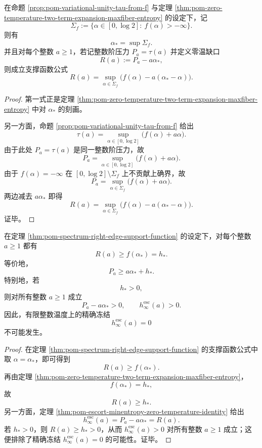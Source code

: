 \begin{theorem}[层集谱右端点与零温缺口的支撑函数表达]\label{thm:pom-spectrum-right-edge-support-function}
在命题 \ref{prop:pom-variational-unity-tau-from-f} 与定理 \ref{thm:pom-zero-temperature-two-term-expansion-maxfiber-entropy} 的设定下，记
\[
\Sigma_f:=\{\alpha\in[0,\log 2]:\ f(\alpha)>-\infty\}.
\]
则有
\[
\alpha_\ast=\sup\Sigma_f.
\]
并且对每个整数 \(a\ge 1\)，若记整数阶压力 \(P_a=\tau(a)\) 并定义零温缺口
\[
R(a):=P_a-a\alpha_\ast,
\]
则成立支撑函数公式
\[
R(a)=\sup_{\alpha\in\Sigma_f}\bigl(f(\alpha)-a(\alpha_\ast-\alpha)\bigr).
\]
\end{theorem}
\begin{proof}
第一式正是定理 \ref{thm:pom-zero-temperature-two-term-expansion-maxfiber-entropy} 中对 \(\alpha_\ast\) 的刻画。

另一方面，命题 \ref{prop:pom-variational-unity-tau-from-f} 给出
\[
\tau(a)=\sup_{\alpha\in[0,\log 2]}\bigl(f(\alpha)+a\alpha\bigr).
\]
由于此处 \(P_a=\tau(a)\) 是同一整数阶压力，故
\[
P_a=\sup_{\alpha\in[0,\log 2]}\bigl(f(\alpha)+a\alpha\bigr).
\]
由于 \(f(\alpha)=-\infty\) 在 \([0,\log 2]\setminus\Sigma_f\) 上不贡献上确界，故
\[
P_a=\sup_{\alpha\in\Sigma_f}\bigl(f(\alpha)+a\alpha\bigr).
\]
两边减去 \(a\alpha_\ast\) 即得
\[
R(a)
=\sup_{\alpha\in\Sigma_f}\bigl(f(\alpha)-a(\alpha_\ast-\alpha)\bigr).
\]
证毕。
\end{proof}

\begin{corollary}[右端谱高度给出的冻结障碍]\label{cor:pom-right-edge-height-freezing-obstruction}
在定理 \ref{thm:pom-spectrum-right-edge-support-function} 的设定下，对每个整数 \(a\ge 1\) 都有
\[
R(a)\ge f(\alpha_\ast)=h_\ast.
\]
等价地，
\[
P_a\ge a\alpha_\ast+h_\ast.
\]
特别地，若
\[
h_\ast>0,
\]
则对所有整数 \(a\ge 1\) 成立
\[
P_a-a\alpha_\ast>0,
\qquad
h_\infty^{\mathrm{esc}}(a)>0.
\]
因此，有限整数温度上的精确冻结
\[
h_\infty^{\mathrm{esc}}(a)=0
\]
不可能发生。
\end{corollary}
\begin{proof}
在定理 \ref{thm:pom-spectrum-right-edge-support-function} 的支撑函数公式中取 \(\alpha=\alpha_\ast\)，即可得到
\[
R(a)\ge f(\alpha_\ast).
\]
再由定理 \ref{thm:pom-zero-temperature-two-term-expansion-maxfiber-entropy}，
\[
f(\alpha_\ast)=h_\ast,
\]
故
\[
R(a)\ge h_\ast.
\]
另一方面，定理 \ref{thm:pom-escort-minentropy-zero-temperature-identity} 给出
\[
h_\infty^{\mathrm{esc}}(a)=P_a-a\alpha_\ast=R(a).
\]
若 \(h_\ast>0\)，则 \(R(a)\ge h_\ast>0\)，从而 \(h_\infty^{\mathrm{esc}}(a)>0\) 对所有整数 \(a\ge 1\) 成立；这便排除了精确冻结 \(h_\infty^{\mathrm{esc}}(a)=0\) 的可能性。证毕。
\end{proof}

\endinput
